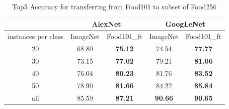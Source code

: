 \begin{table}[htbp]
  \centering
  \caption{Top5 Accuracy for transferring from Food101 to subset of Food256}
    \begin{tabular}{c|cc|cc}
    \toprule
          & \multicolumn{2}{c|}{AlexNet} & \multicolumn{2}{c}{GoogLeNet} \\
    \midrule
    instances per class & ImageNet  & Food101\_ft    &  ImageNet  & Food101\_ft \\ \midrule
    20    & 68.80  & \textbf{75.12} & 74.54 & \textbf{77.77} \\
    30    & 73.15 & \textbf{77.02} & 79.21 & \textbf{81.06} \\
    40    & 76.04 & \textbf{80.23} & 81.76 & \textbf{83.52} \\
    50    & 78.90  & \textbf{81.66} & 84.22 & \textbf{85.84} \\
    all    & 85.59 &  \textbf{87.21} & \textbf{90.66 }&   \textbf{90.65}     \\
    \bottomrule
    \end{tabular}%
  \label{tab:cross}%
\end{table}%

